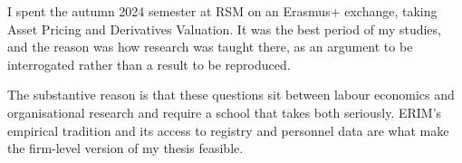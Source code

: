 \documentclass[a4paper,11pt]{article}
\begin{document}
I spent the autumn 2024 semester at RSM on an Erasmus+ exchange, taking Asset Pricing and Derivatives Valuation. It was the best period of my studies, and the reason was how research was taught there, as an argument to be interrogated rather than a result to be reproduced.

The substantive reason is that these questions sit between labour economics and organisational research and require a school that takes both seriously. ERIM's empirical tradition and its access to registry and personnel data are what make the firm-level version of my thesis feasible.

\vspace{3mm}
\end{document}

